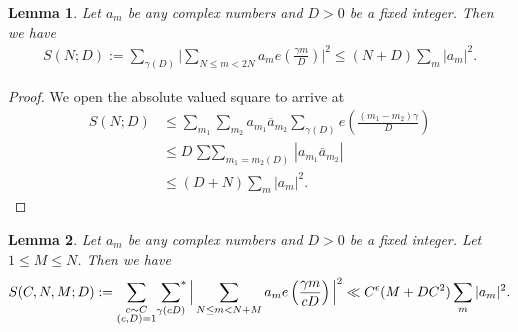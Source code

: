 \documentclass[12pt,a4paper,twoside, reqno]{amsart}
\newcommand{\sumstar}{\sideset{}{^*}\sum}
\newtheorem{lemma}{Lemma}
\begin{document}
    
\begin{lemma}\label{C=1}
    Let $a_m$ be any complex numbers and $D>0$ be a fixed  integer.  Then  we have 
       \begin{align}
   S(N;D):= \sum_{\gamma (D)}  \Big|\sum_{N \leq m < 2N} a_m  e\left( \frac{\gamma m}{D} \right) \Big| ^2  \leq (N +  D) \sum_m|a_m|^2.
\end{align}
\end{lemma}
\begin{proof}
 We open the absolute valued square to arrive at 
\begin{align*}
   S(N;D) &\leq  \sum_{m_1}  \sum_{m_2} a_{m_1}\overline{a}_{m_2} \sum_{\gamma (D)}  e\left(\frac{ (m_1-m_2) \gamma }{D} \right) \\
   &\leq  D  \mathop{\sum \sum }_{m_1=m_2 (D)}   |a_{m_1}\overline{a}_{m_2}| \\
  &\leq (D+N) \sum_m |a_{m}|^2.
\end{align*} 
\end{proof}
\begin{lemma}\label{large sieve with level}
    Let $a_m$ be any complex numbers and $D>0$ be a fixed  integer. Let $1 \leq M\leq N$. Then  we have 
    \begin{align}\label{small N}
   S(C,N,M;D):= \mathop{\sum_{\substack{c \sim C \\ (c,D)=1}}}\sumstar_{\gamma (cD)}  \Big|\sum_{N \leq m < N+M} a_m  e\left( \frac{\gamma m}{cD} \right) \Big| ^2  \ll  C^\epsilon(M +  DC^2) \sum_m|a_m|^2.
\end{align}
\end{lemma}
\end{document}

